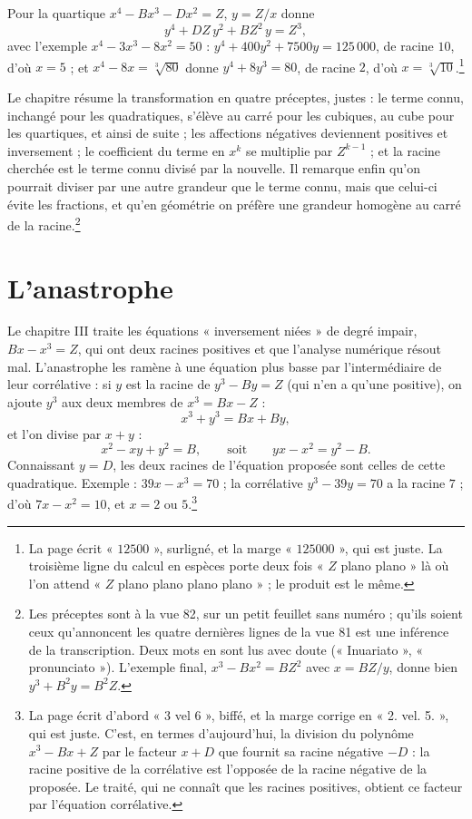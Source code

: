 \documentclass[11pt,a4paper]{article}
\begin{document}
Pour la quartique $x^4 - Bx^3 - Dx^2 = Z$, $y = Z/x$ donne
\[ y^4 + DZ\,y^2 + BZ^2\,y = Z^3 , \]
avec l'exemple $x^4 - 3x^3 - 8x^2 = 50$ : $y^4 + 400y^2 + 7500y = 125\,000$, de
racine $10$, d'où $x = 5$ ; et $x^4 - 8x = \sqrt[3]{80}$ donne $y^4 + 8y^3 = 80$,
de racine $2$, d'où $x = \sqrt[3]{10}$.\footnote{La page écrit « $12500$ »,
surligné, et la marge « $125000$ », qui est juste. La troisième ligne du calcul
en espèces porte deux fois « $Z$ plano plano » là où l'on attend « $Z$ plano plano
plano plano » ; le produit est le même.}

Le chapitre résume la transformation en quatre préceptes, justes : le terme
connu, inchangé pour les quadratiques, s'élève au carré pour les cubiques, au
cube pour les quartiques, et ainsi de suite ; les affections négatives
deviennent positives et inversement ; le coefficient du terme en $x^k$ se
multiplie par $Z^{k-1}$ ; et la racine cherchée est le terme connu divisé par la
nouvelle. Il remarque enfin qu'on pourrait diviser par une autre grandeur que
le terme connu, mais que celui-ci évite les fractions, et qu'en géométrie on
préfère une grandeur homogène au carré de la racine.\footnote{Les préceptes sont à
la vue 82, sur un petit feuillet sans numéro ; qu'ils soient ceux qu'annoncent
les quatre dernières lignes de la vue 81 est une inférence de la transcription.
Deux mots en sont lus avec doute (« Inuariato », « pronunciato »). L'exemple
final, $x^3 - Bx^2 = BZ^2$ avec $x = BZ/y$, donne bien $y^3 + B^2y = B^2Z$.}

\section*{L'anastrophe}

Le chapitre III traite les équations « inversement niées » de degré impair,
$Bx - x^3 = Z$, qui ont deux racines positives et que l'analyse numérique
résout mal. L'anastrophe les ramène à une équation plus basse par
l'intermédiaire de leur corrélative : si $y$ est la racine de $y^3 - By = Z$
(qui n'en a qu'une positive), on ajoute $y^3$ aux deux membres de
$x^3 = Bx - Z$ :
\[ x^3 + y^3 = Bx + By , \]
et l'on divise par $x + y$ :
\[ x^2 - xy + y^2 = B , \qquad\text{soit}\qquad yx - x^2 = y^2 - B . \]
Connaissant $y = D$, les deux racines de l'équation proposée sont celles de cette
quadratique. Exemple : $39x - x^3 = 70$ ; la corrélative $y^3 - 39y = 70$ a la
racine $7$ ; d'où $7x - x^2 = 10$, et $x = 2$ ou $5$.\footnote{La page écrit
d'abord « 3 vel 6 », biffé, et la marge corrige en « 2. vel. 5. », qui est juste.
C'est, en termes d'aujourd'hui, la division du polynôme $x^3 - Bx + Z$ par le
facteur $x + D$ que fournit sa racine négative $-D$ : la racine positive de la
corrélative est l'opposée de la racine négative de la proposée. Le traité, qui
ne connaît que les racines positives, obtient ce facteur par l'équation
corrélative.}
\end{document}
